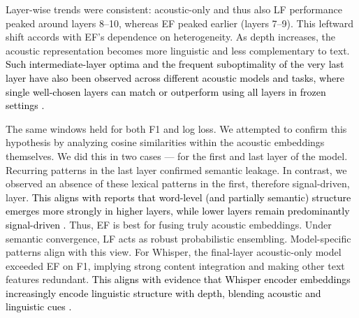 \documentclass{article}
\begin{document}
{\begin{figure}[t!]
\end{figure}

Layer-wise trends were consistent: acoustic-only and thus also LF performance peaked around layers 8–10, whereas EF peaked earlier (layers 7–9). This leftward shift accords with EF’s dependence on heterogeneity. As depth increases, the acoustic representation becomes more linguistic and less complementary to text. \textcolor{black}{Such intermediate-layer optima and the frequent suboptimality of the very last layer have also been observed across different acoustic models and tasks, where single well-chosen layers can match or outperform using all layers in frozen settings \cite{pasad2023, maji2024, cooper2025}.} 

The same windows held for both F1 and log loss. We attempted to confirm this hypothesis by analyzing cosine similarities within the acoustic embeddings themselves. We did this in two cases — for the first and last layer of the model. Recurring patterns in the last layer confirmed semantic leakage. In contrast, we observed an absence of these lexical patterns in the first, therefore signal-driven, layer. \textcolor{black}{This aligns with reports that word-level (and partially semantic) structure emerges more strongly in higher layers, while lower layers remain predominantly signal-driven \cite{pasad2021, pasad2023}.} Thus, EF is best for fusing truly acoustic embeddings. Under semantic convergence, LF acts as robust probabilistic ensembling. Model-specific patterns align with this view. For Whisper, the final-layer acoustic-only model exceeded EF on F1, implying strong content integration and making other text features redundant. \textcolor{black}{This aligns with evidence that Whisper encoder embeddings increasingly encode linguistic structure with depth, blending acoustic and linguistic cues \cite{anderson2024}.}


}
\end{document}
